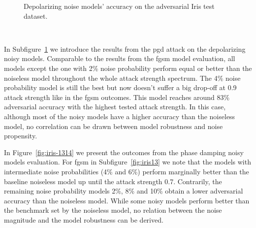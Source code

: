 \begin{figure}[!h]
\begin{subfigure}{0.45\textwidth}
      \label{fig:iris12}
  \end{subfigure}
  \caption{Depolarizing noise models' accuracy on the adversarial Iris test dataset.}
  \label{fig:iris-1112}
\end{figure} \

In Subfigure~\ref{fig:iris12} we introduce the results from the \ac{pgd}
attack on the depolarizing noisy models. Comparable to the results from
the \ac{fgsm} model evaluation, all models except the one with 2\% noise
probability perform equal or better than the noiseless model throughout
the whole attack strength spectrum. The 4\% noise probability model is
still the best but now doesn't suffer a big drop-off at 0.9 attack strength
like in the \ac{fgsm} outcomes. This model reaches around 83\% adversarial
accuracy with the highest tested attack strength. In this case, although
most of the noisy models have a higher accuracy than the noiseless model,
no correlation can be drawn between model robustness and noise propensity. \

In Figure~\ref{fig:iris-1314} we present the outcomes from the phase damping
noisy models evaluation. For \ac{fgsm} in Subfigure~\ref{fig:iris13}
we note that the models with intermediate noise probabilities (4\% and 6\%)
perform marginally better than the baseline noiseless model up until the
attack strength 0.7. Contrarily, the remaining noise probability models 2\%,
8\% and 10\% obtain a lower adversarial accuracy than the noiseless model.
While some noisy models perform better than the benchmark set by the noiseless
model, no relation between the noise magnitude and the model robustness can
be derived. \


